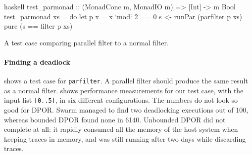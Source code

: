 \begin{listing}
\centering
\begin{cminted}{haskell}
test_parmonad :: (MonadConc m, MonadIO m) => [Int] -> m Bool
test_parmonad xs = do
    let p x = x `mod` 2 == 0
    s <- runPar (parfilter p xs)
    pure (s == filter p xs)
\end{cminted}
\caption{A test case comparing parallel filter to a normal filter.}\label{lst:parmonad_example2}
\end{listing}

\paragraph{Finding a deadlock}
 shows a test case for \verb|parfilter|.
A parallel filter should produce the same result as a normal filter.
 shows performance measurements for our test
case, with the input list \verb|[0..5]|, in six different
configurations.  The numbers do not look so good for DPOR.  Swarm
managed to find two deadlocking executions out of 100, whereas bounded
DPOR found none in 6140.  Unbounded DPOR did not complete at all: it
rapidly consumed all the memory of the host system when keeping traces
in memory, and was still running after two days while discarding
traces.

